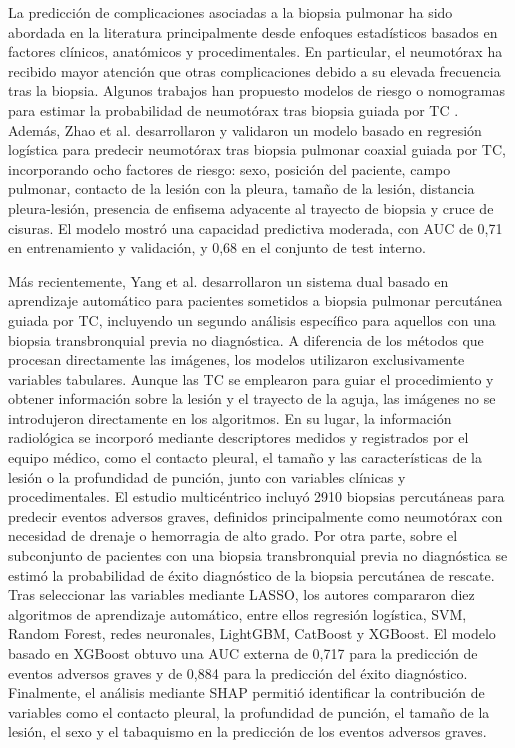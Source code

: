 La predicción de complicaciones asociadas a la biopsia pulmonar ha sido abordada en la literatura principalmente desde enfoques estadísticos basados en factores clínicos, anatómicos y procedimentales. En particular, el neumotórax ha recibido mayor atención que otras complicaciones debido a su elevada frecuencia tras la biopsia. Algunos trabajos han propuesto modelos de riesgo o nomogramas para estimar la probabilidad de neumotórax tras biopsia guiada por TC \cite{Anzidei2015,Zhao2017,Wang2019,Weon2021,Yang2021}. Además, Zhao et al. \cite{Zhao2022} desarrollaron y validaron un modelo basado en regresión logística para predecir neumotórax tras biopsia pulmonar coaxial guiada por TC, incorporando ocho factores de riesgo: sexo, posición del paciente, campo pulmonar, contacto de la lesión con la pleura, tamaño de la lesión, distancia pleura-lesión, presencia de enfisema adyacente al trayecto de biopsia y cruce de cisuras. El modelo mostró una capacidad predictiva moderada, con AUC de 0,71 en entrenamiento y validación, y 0,68 en el conjunto de test interno.

Más recientemente, Yang et al. \cite{yang2026machine} desarrollaron un sistema dual basado en aprendizaje automático para pacientes sometidos a biopsia pulmonar percutánea guiada por TC, incluyendo un segundo análisis específico para aquellos con una biopsia transbronquial previa no diagnóstica. A diferencia de los métodos que procesan directamente las imágenes, los modelos utilizaron exclusivamente variables tabulares. Aunque las TC se emplearon para guiar el procedimiento y obtener información sobre la lesión y el trayecto de la aguja, las imágenes no se introdujeron directamente en los algoritmos. En su lugar, la información radiológica se incorporó mediante descriptores medidos y registrados por el equipo médico, como el contacto pleural, el tamaño y las características de la lesión o la profundidad de punción, junto con variables clínicas y procedimentales. El estudio multicéntrico incluyó 2910 biopsias percutáneas para predecir eventos adversos graves, definidos principalmente como neumotórax con necesidad de drenaje o hemorragia de alto grado. Por otra parte, sobre el subconjunto de pacientes con una biopsia transbronquial previa no diagnóstica se estimó la probabilidad de éxito diagnóstico de la biopsia percutánea de rescate. Tras seleccionar las variables mediante LASSO, los autores compararon diez algoritmos de aprendizaje automático, entre ellos regresión logística, SVM, Random Forest, redes neuronales, LightGBM, CatBoost y XGBoost. El modelo basado en XGBoost obtuvo una AUC externa de 0,717 para la predicción de eventos adversos graves y de 0,884 para la predicción del éxito diagnóstico. Finalmente, el análisis mediante SHAP permitió identificar la contribución de variables como el contacto pleural, la profundidad de punción, el tamaño de la lesión, el sexo y el tabaquismo en la predicción de los eventos adversos graves.

